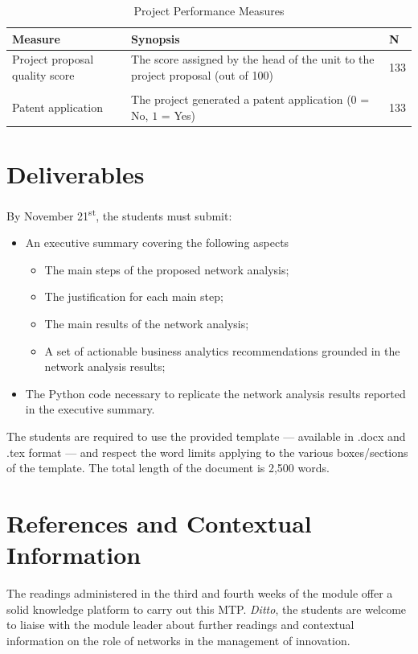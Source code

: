 \documentclass[11pt]{article}
\begin{document}
\begin{table}[!htbp]
	\begin{small}
		\caption{Project Performance Measures}
		\label{tab:project_performance}
		\begin{center}
			\begin{tabular}[c]{p{5cm}|p{6cm}|p{1cm}}
				\textbf{Measure} 
				& \textbf{Synopsis}
				& \textbf{N}\\
				\hline
				Project proposal quality score\dotfill
				& \quad The score assigned by the head of the unit to the project proposal (out of 100)  
				& 133 \\
				\\[-1.8ex]
				Patent application\dotfill
				& \quad The project generated a patent application 
				($0$ = No, $1$ = Yes)
				& 133 \\ 
				\hline
			\end{tabular}
		\end{center}
	\end{small}
\end{table}


\clearpage

\section{Deliverables}

By November 21\textsuperscript{st}, the students must submit:
\begin{itemize}
	\item  
	An executive summary covering the following aspects
	\begin{itemize}
		\item 
		The main steps of the proposed network analysis;
		\item 
		The justification for each main step;
		\item 
		The main results of the network analysis;
		\item 
		A set of actionable business analytics recommendations 
		grounded in the network analysis results;
	\end{itemize}
	\item
	The Python code necessary to replicate the network analysis
	results reported in the executive summary.
\end{itemize}

The students are required to use the provided template --- available in .docx
and .tex format --- and respect the word limits applying to the various
boxes/sections of the template. The total length of the document is 2,500 words.

\section{References and Contextual Information}

The readings administered  in the third and fourth weeks of the module 
offer a solid knowledge platform to carry out this MTP. 
\textit{Ditto}, the students are welcome to liaise with the module leader about 
further readings and contextual information on the role of networks 
in the management of innovation.
\end{document}

